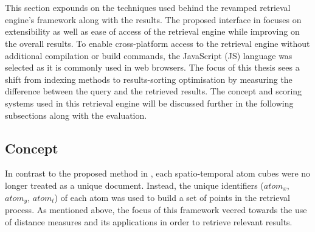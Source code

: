 \section{\versionTwoRet}
\label{section:versionTwo}

This section expounds on the techniques used behind the revamped retrieval
engine's framework along with the results. The proposed interface in
\versionTwoRet focuses on extensibility as well as ease of access of the
retrieval engine while improving on the overall results. To enable
cross-platform access to the retrieval engine without additional compilation
or build commands, the JavaScript (JS) language was selected as it is commonly
used in web browsers.
The focus of this thesis sees a shift from indexing methods to results-sorting
optimisation by measuring the difference between the query and the retrieved
results. The concept and scoring systems used in this retrieval engine will be
discussed further in the following subsections along with the evaluation.

\subsection{Concept}

In contrast to the proposed method in \versionOneRet, each spatio-temporal atom
cubes were no longer treated as a unique document. Instead, the unique
identifiers ($atom_x$, $atom_y$, $atom_t$) of each atom was used to build a
set of points in the retrieval process. As mentioned above, the focus of this
framework veered towards the use of distance measures 
and its applications in order to retrieve
relevant results.

